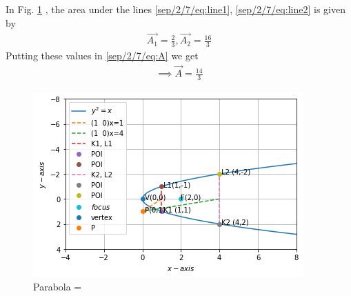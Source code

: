 In Fig. \ref{sep/2/7/fig:parab_tangent}	, the  area under the lines \eqref{sep/2/7/eq:line1}, \eqref{sep/2/7/eq:line2} is given by
\begin{align}
\vec{A_1} =\frac{2}{3},
\vec{A_2}=\frac{16}{3}  
\end{align}
Putting these values in \eqref{sep/2/7/eq:A} we get
\begin{align}
\implies\boxed{\vec{A} =\frac{14}{3}}
\end{align}
%
\begin{figure}[!ht]
\centering
\includegraphics[width=\columnwidth]{solutions/sep/2/7/download.png}
\caption{Parabola  =  }
\label{sep/2/7/fig:parab_tangent}	
\end{figure}


